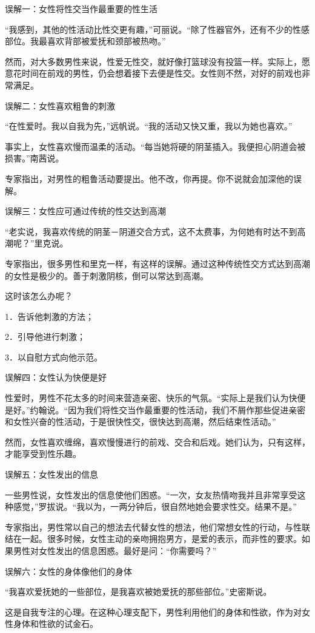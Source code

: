 \documentclass[12pt,UTF8,openany]{ctexbook}
\begin{document}
误解一：女性将性交当作最重要的性生活

“我感到，其他的性活动比性交更有趣，”可丽说。“除了性器官外，还有不少的性感部位。我最喜欢背部被爱抚和颈部被热吻。”

然而，对大多数男性来说，性爱无性交，就好像打篮球没有投篮一样。实际上，愿意花时间在前戏的男性，仍会想着接下去便是性交。女性则不然，对好的前戏也非常满足。

误解二：女性喜欢粗鲁的刺激

“在性爱时。我以自我为先，”远帆说。“我的活动又快又重，我以为她也喜欢。”

事实上，女性喜欢慢而温柔的活动。“每当她将硬的阴茎插入。我便担心阴道会被损害。”南茜说。

专家指出，对男性的粗鲁活动要提出。他不改，你再提。你不说就会加深他的误解。

误解三：女性应可通过传统的性交达到高潮

“老实说，我喜欢传统的阴茎－阴道交合方式，这不太费事，为何她有时达不到高潮呢？”里克说。

专家指出，很多男性和里克一样，有这样的误解。通过这种传统性交方式达到高潮的女性是极少的。善于刺激阴核，倒可以常达到高潮。

这时该怎么办呢？

1．告诉他刺激的方法；

2．引导他进行刺激；

3．以自慰方式向他示范。

误解四：女性认为快便是好

性爱时，男性不花太多的时间来营造亲密、快乐的气氛。“实际上是我们认为快便是好。”约翰说。“因为我们将性交当作最重要的性活动，我们不屑作那些促进亲密和女性兴奋的性活动，于是很快性交，很快达到高潮，然后结束性活动。”

然而，女性喜欢缠绵，喜欢慢慢进行的前戏、交合和后戏。她们认为，只有这样，才能享受到性乐趣。

误解五：女性发出的信息

一些男性说，女性发出的信息使他们困惑。“一次，女友热情吻我并且非常享受这种感觉，”罗拔说。“我以为，一两分钟后，很自然地她会要求性交。结果不是。”

专家指出，男性常以自己的想法去代替女性的想法，他们常想女性的行动，与性联结在一起。很多时候，女性主动的亲吻拥抱男方，是爱的表示，而非性的要求。如果男性对女性发出的信息困惑。最好是问：“你需要吗？”

误解六：女性的身体像他们的身体

“我喜欢爱抚她的一些部位，是我喜欢被她爱抚的那些部位。”史密斯说。

这是自我专注的心理。在这种心理支配下，男性利用他们的身体和性欲，作为对女性身体和性欲的试金石。
\end{document}
